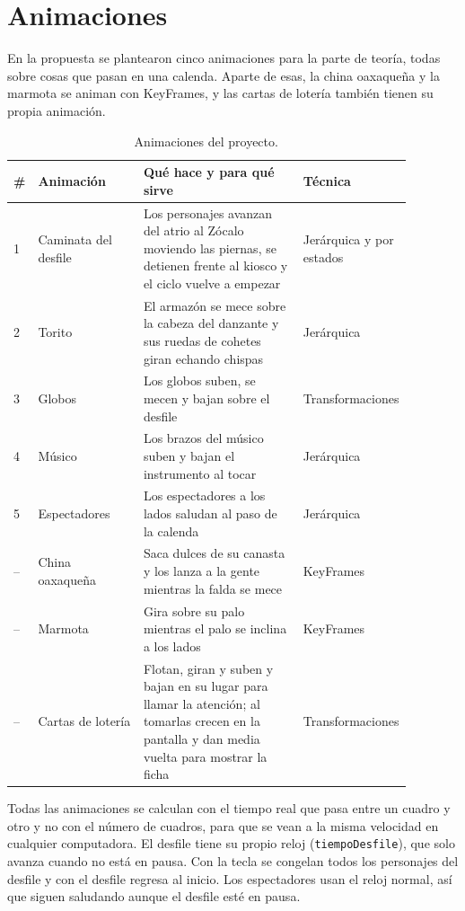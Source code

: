 \documentclass[11pt,a4paper]{article}
\begin{document}
\section{Animaciones}
\label{sec:animaciones}

En la propuesta se plantearon cinco animaciones para la parte de teoría, todas sobre cosas que pasan en una calenda. Aparte de esas, la china oaxaqueña y la marmota se animan con KeyFrames, y las cartas de lotería también tienen su propia animación.

\begin{table}[H]
  \centering
  \small
  \begin{tabular}{|p{0.04\linewidth}|p{0.27\linewidth}|p{0.42\linewidth}|p{0.15\linewidth}|}
    \hline
    \textbf{\#} & \textbf{Animación} & \textbf{Qué hace y para qué sirve} & \textbf{Técnica} \\ \hline
    1 & Caminata del desfile & Los personajes avanzan del atrio al Zócalo moviendo las piernas, se detienen frente al kiosco y el ciclo vuelve a empezar & Jerárquica y por estados \\ \hline
    2 & Torito & El armazón se mece sobre la cabeza del danzante y sus ruedas de cohetes giran echando chispas & Jerárquica \\ \hline
    3 & Globos & Los globos suben, se mecen y bajan sobre el desfile & Transforma\-ciones \\ \hline
    4 & Músico & Los brazos del músico suben y bajan el instrumento al tocar & Jerárquica \\ \hline
    5 & Espectadores & Los espectadores a los lados saludan al paso de la calenda & Jerárquica \\ \hline
    -- & China oaxaqueña & Saca dulces de su canasta y los lanza a la gente mientras la falda se mece & KeyFrames \\ \hline
    -- & Marmota & Gira sobre su palo mientras el palo se inclina a los lados & KeyFrames \\ \hline
    -- & Cartas de lotería & Flotan, giran y suben y bajan en su lugar para llamar la atención; al tomarlas crecen en la pantalla y dan media vuelta para mostrar la ficha & Transforma\-ciones \\ \hline
  \end{tabular}
  \caption{Animaciones del proyecto.}
\end{table}

Todas las animaciones se calculan con el tiempo real que pasa entre un cuadro y otro y no con el número de cuadros, para que se vean a la misma velocidad en cualquier computadora. El desfile tiene su propio reloj (\texttt{tiempoDesfile}), que solo avanza cuando no está en pausa. Con la tecla  se congelan todos los personajes del desfile y con  el desfile regresa al inicio. Los espectadores usan el reloj normal, así que siguen saludando aunque el desfile esté en pausa.
\end{document}
